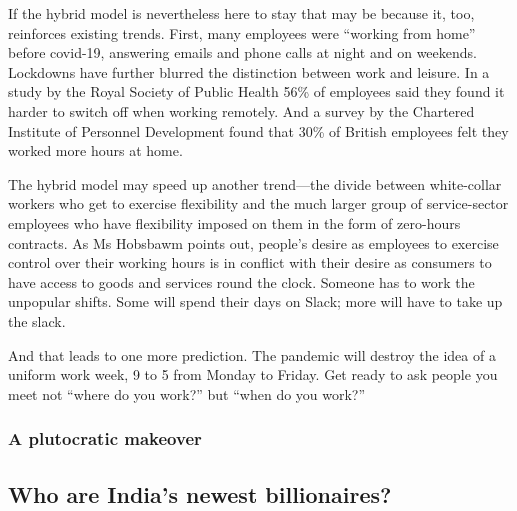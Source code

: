 \documentclass{article}
\begin{document}
If the hybrid model is nevertheless here to stay that may be because it, too, reinforces existing trends. First, many employees were ``working from home'' before covid-19, answering emails and phone calls at night and on weekends. Lockdowns have further blurred the distinction between work and leisure. In a study by the Royal Society of Public Health 56\% of employees said they found it harder to switch off when working remotely. And a survey by the Chartered Institute of Personnel Development found that 30\% of British employees felt they worked more hours at home. 

The hybrid model may speed up another trend---the divide between white-collar workers who get to exercise flexibility and the much larger group of service-sector employees who have flexibility imposed on them in the form of zero-hours contracts. As Ms Hobsbawm points out, people's desire as employees to exercise control over their working hours is in conflict with their desire as consumers to have access to goods and services round the clock. Someone has to work the unpopular shifts. Some will spend their days on Slack; more will have to take up the slack. 

And that leads to one more prediction. The pandemic will destroy the idea of a uniform work week, 9 to 5 from Monday to Friday. Get ready to ask people you meet not ``where do you work?'' but ``when do you work?'' 
\clearpage
\subsubsection{A plutocratic makeover }
\subsection{Who are India's newest billionaires? }
\end{document}
